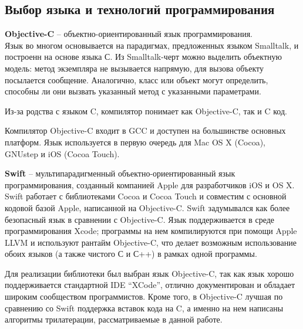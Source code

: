 \subsection{Выбор языка и технологий программирования}

\textbf{Objective-C} -- объектно-ориентированный язык программирования. \\Язык во многом основывается на парадигмах, предложенных языком Small\-talk, и построенн на основе языка С. Из Smalltalk-черт можно выделить объектную модель: метод экземпляра не вызывается напрямую, для вызова объекту посылается сообщение. Аналогично, класс или объект могут определить, способны ли они вызвать указанный метод с указанными параметрами.

Из-за родства с языком C, компилятор понимает как Objective-C, так и C код.

Компилятор Objective-C входит в GCC и доступен на большинстве основных платформ. Язык используется в первую очередь для Mac OS X (Cocoa), GNUstep и iOS (Cocoa Touch).

\textbf{Swift} -- мультипарадигменный объектно-ориентированный язык программирования, созданный компанией Apple для разработчиков iOS и OS X. Swift работает с библиотеками Cocoa и Cocoa Touch и совместим с основной кодовой базой Apple, написанной на Objective-C. Swift задумывался как более безопасный язык в сравнении с Objective-C. Язык поддерживается в среде программирования Xcode; программы на нем компилируются при помощи Apple LLVM и используют рантайм Objective-C, что делает возможным использование обоих языков (а также чистого С и С++) в рамках одной программы.

Для реализации библиотеки был выбран язык Objective-C, так как язык хорошо поддерживается стандартной IDE “XCode”, отлично документирован и обладает широким сообществом программистов. Кроме того, в Objective-C лучшая по сравнению со Swift поддержка вставок кода на C, а именно на нем написаны алгоритмы трилатерации, рассматриваемые в данной работе.